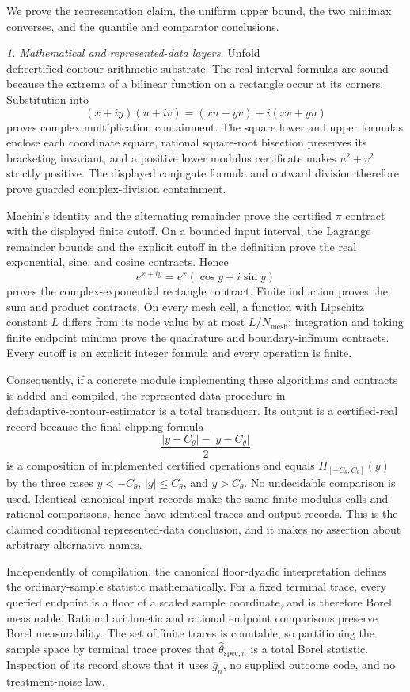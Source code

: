 We prove the representation claim, the uniform upper bound, the two minimax converses, and the quantile and comparator conclusions.

\emph{1. Mathematical and represented-data layers.}  Unfold \(\text{def:certified-contour-arithmetic-substrate}\).  The real interval formulas are sound because the extrema of a bilinear function on a rectangle occur at its corners.  Substitution into
\[
 (x+iy)(u+iv)=(xu-yv)+i(xv+yu)
\]
proves complex multiplication containment.  The square lower and upper formulas enclose each coordinate square, rational square-root bisection preserves its bracketing invariant, and a positive lower modulus certificate makes \(u^2+v^2\) strictly positive.  The displayed conjugate formula and outward division therefore prove guarded complex-division containment.

Machin's identity and the alternating remainder prove the certified \(\pi\) contract with the displayed finite cutoff.  On a bounded input interval, the Lagrange remainder bounds and the explicit cutoff in the definition prove the real exponential, sine, and cosine contracts.  Hence
\[
 e^{x+iy}=e^x(\cos y+i\sin y)
\]
proves the complex-exponential rectangle contract.  Finite induction proves the sum and product contracts.  On every mesh cell, a function with Lipschitz constant \(L\) differs from its node value by at most \(L/N_{\mathrm{mesh}}\); integration and taking finite endpoint minima prove the quadrature and boundary-infimum contracts.  Every cutoff is an explicit integer formula and every operation is finite.

Consequently, if a concrete module implementing these algorithms and contracts is added and compiled, the represented-data procedure in \(\text{def:adaptive-contour-estimator}\) is a total transducer.  Its output is a certified-real record because the final clipping formula
\[
 \frac{|y+C_{\theta}|-|y-C_{\theta}|}{2}
\]
is a composition of implemented certified operations and equals \(\Pi_{[-C_{\theta},C_{\theta}]}(y)\) by the three cases \(y<-C_{\theta}\), \(|y|\le C_{\theta}\), and \(y>C_{\theta}\).  No undecidable comparison is used.  Identical canonical input records make the same finite modulus calls and rational comparisons, hence have identical traces and output records.  This is the claimed conditional represented-data conclusion, and it makes no assertion about arbitrary alternative names.

Independently of compilation, the canonical floor-dyadic interpretation defines the ordinary-sample statistic mathematically.  For a fixed terminal trace, every queried endpoint is a floor of a scaled sample coordinate, and is therefore Borel measurable.  Rational arithmetic and rational endpoint comparisons preserve Borel measurability.  The set of finite traces is countable, so partitioning the sample space by terminal trace proves that \(\widehat\theta_{\mathrm{spec},n}\) is a total Borel statistic.  Inspection of its record shows that it uses \(\bar g_n\), no supplied outcome code, and no treatment-noise law.

